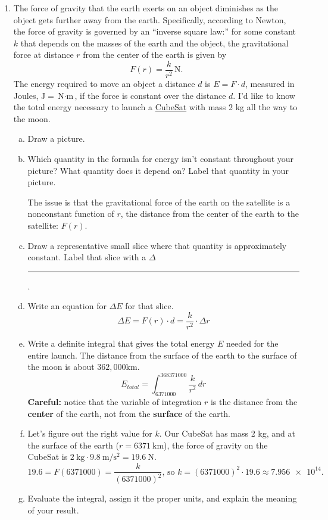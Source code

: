 \documentclass[12pt]{article}
\newenvironment{red}{\color{red}}{\ignorespacesafterend}
\begin{document}
\begin{enumerate}
\item The force of gravity that the earth exerts on an object diminishes as the object gets further away from the earth. Specifically, according to Newton, the force of gravity is governed by an ``inverse square law:'' for some constant \(k\) that depends on the masses of the earth and the object, the gravitational force at distance \(r\) from the center of the earth is given by 
\[ F(r) = \frac{k}{r^2}\, \unit{\N}.\]
The energy required to move an object a distance \(d\) is \(E = F\cdot d\), measured in Joules, \(\unit{\J} = \unit{\N \cdot \m}\), if the force is constant over the distance \(d\).  I'd like to know the total energy necessary to launch a \href{https://en.wikipedia.org/wiki/CubeSat}{CubeSat} with mass 2 kg all the way to the moon.
\begin{enumerate}[(a)]
    \item Draw a picture.
    \item Which quantity in the formula for energy isn't constant throughout your picture? What quantity does it depend on? Label that quantity in your picture.

    \begin{red}
        The issue is that the gravitational force of the earth on the satellite is a nonconstant function of $r$, the distance from the center of the earth to the satellite: $F(r)$.
    \end{red}
    \item Draw a representative small slice where that quantity is approximately constant. Label that slice with a \(\Delta\)\rule{0.5cm}{0.15mm}.
    \item Write an equation for \(\Delta E\) for that slice.
    \begin{red}
        \[\Delta E = F(r)\cdot d = \frac{k}{r^2}\cdot\Delta r\]
    \end{red}
    \item Write a definite integral that gives the total energy \(E\) needed for the entire launch. The distance from the surface of the earth to the surface of the moon is about \(362{,}000\unit{\km}\).
    \begin{red}
        \[E_{total} = \int_{6371000}^{368371000}\frac{k}{r^2}\,dr\]
        \textbf{Careful:} notice that the variable of integration $r$ is the distance from the \textbf{center} of the earth, not from the \textbf{surface} of the earth.
    \end{red}
    \item Let's figure out the right value for \(k\). Our CubeSat has mass 2 kg, and at the surface of the earth (\(r = \qty{6371}{\km}\)), the force of gravity on the CubeSat is \(\qty{2}{\kg}\cdot\qty{9.8}{\m/\s^2} = \qty{19.6}{\N}\).
    \begin{red}
        \[19.6 = F(6371000) = \frac{k}{(6371000)^2} \text{, so } k = (6371000)^2\cdot 19.6 \approx \num{7.956e14}. \]
    \end{red}
    \item Evaluate the integral, assign it the proper units, and explain the meaning of your result.


\end{enumerate}
\end{enumerate}
\end{document}
